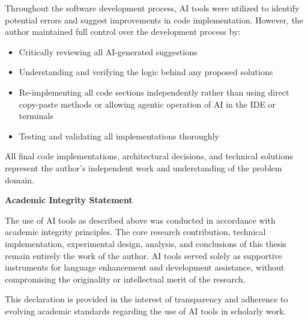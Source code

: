 \begin{appendices}
Throughout the software development process, AI tools were utilized to identify potential errors and suggest improvements in code implementation. However, the author maintained full control over the development process by:

\begin{itemize}
    \item Critically reviewing all AI-generated suggestions
    \item Understanding and verifying the logic behind any proposed solutions
    \item Re-implementing all code sections independently rather than using direct copy-paste methods or allowing agentic operation of AI in the IDE or terminals
    \item Testing and validating all implementations thoroughly
\end{itemize}

All final code implementations, architectural decisions, and technical solutions represent the author's independent work and understanding of the problem domain.

\textbf{Academic Integrity Statement}

The use of AI tools as described above was conducted in accordance with academic integrity principles. The core research contribution, technical implementation, experimental design, analysis, and conclusions of this thesis remain entirely the work of the author. AI tools served solely as supportive instruments for language enhancement and development assistance, without compromising the originality or intellectual merit of the research.

This declaration is provided in the interest of transparency and adherence to evolving academic standards regarding the use of AI tools in scholarly work.





\end{appendices}